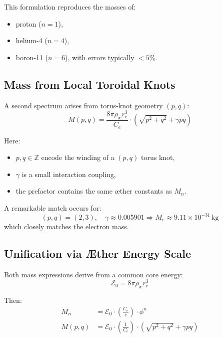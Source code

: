 \documentclass[a4paper,12pt]{article}
\begin{document}
        This formulation reproduces the masses of:
        \begin{itemize}
          \item proton ($n=1$),
          \item helium-4 ($n=4$),
          \item boron-11 ($n=6$),
          with errors typically $< 5\%$.
        \end{itemize}

        \subsection{Mass from Local Toroidal Knots}

        A second spectrum arises from torus-knot geometry $(p,q)$:
        \begin{equation}
        M(p,q) = \frac{8\pi \rho_{\text{æ}} r_c^3}{C_e} \cdot \left( \sqrt{p^2 + q^2} + \gamma pq \right)
        \end{equation}

        Here:
        \begin{itemize}
          \item $p, q \in \mathbb{Z}$ encode the winding of a $(p,q)$ torus knot,
          \item $\gamma$ is a small interaction coupling,
          \item the prefactor contains the same æther constants as $M_n$.
        \end{itemize}

        A remarkable match occurs for:
        \[
        (p,q) = (2,3), \quad \gamma \approx 0.005901
        \Rightarrow M_e \approx 9.11 \times 10^{-31} \, \text{kg}
        \]
        which closely matches the electron mass.

        \subsection{Unification via Æther Energy Scale}

        Both mass expressions derive from a common core energy:
        \[
        \mathcal{E}_0 = 8\pi \rho_{\text{æ}} r_c^3
        \]

        Then:
        \begin{align}
        M_n &= \mathcal{E}_0 \cdot \left( \frac{C_e}{c} \right) \cdot \phi^n \\
        M(p,q) &= \mathcal{E}_0 \cdot \left( \frac{1}{C_e} \right) \cdot \left( \sqrt{p^2 + q^2} + \gamma pq \right)
        \end{align}
\end{document}

